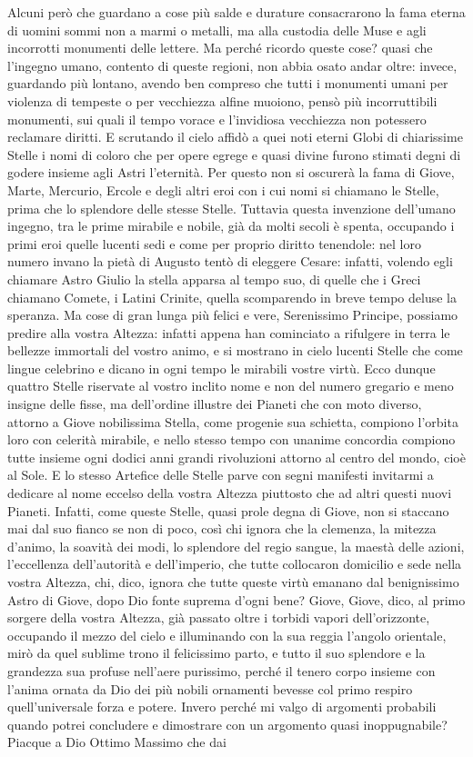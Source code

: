 \documentclass[11pt,twoside,openany]{book}
\begin{document}
Alcuni però che guardano a cose più salde e durature consacrarono la fama eterna di uomini sommi non a marmi o metalli, ma alla custodia delle Muse e agli incorrotti monumenti delle lettere. Ma perché ricordo queste cose? quasi che l'ingegno umano, contento di queste regioni, non abbia osato andar oltre: invece, guardando più lontano, avendo ben compreso che tutti i monumenti umani per violenza di tempeste o per vecchiezza alfine muoiono, pensò più incorruttibili monumenti, sui quali il tempo vorace e l'invidiosa vecchiezza non potessero reclamare diritti. E scrutando il cielo affidò a quei noti eterni Globi di chiarissime Stelle i nomi di coloro che per opere egrege e quasi divine furono stimati degni di godere insieme agli Astri l'eternità. Per questo non si oscurerà la fama di Giove, Marte, Mercurio, Ercole e degli altri eroi con i cui nomi si chiamano le Stelle, prima che lo splendore delle stesse Stelle. Tuttavia questa invenzione dell'umano ingegno, tra le prime mirabile e nobile, già da molti secoli è spenta, occupando i primi eroi quelle lucenti sedi e come per proprio diritto tenendole: nel loro numero invano la pietà di Augusto tentò di eleggere Cesare: infatti, volendo egli chiamare Astro Giulio la stella apparsa al tempo suo, di quelle che i Greci chiamano Comete, i Latini Crinite, quella scomparendo in breve tempo deluse la speranza. Ma cose di gran lunga più felici e vere, Serenissimo Principe, possiamo predire alla vostra Altezza: infatti appena han cominciato a rifulgere in terra le bellezze immortali del vostro animo, e si mostrano in cielo lucenti Stelle che come lingue celebrino e dicano in ogni tempo le mirabili vostre virtù. Ecco dunque quattro Stelle riservate al vostro inclito nome e non del numero gregario e meno insigne delle fisse, ma dell'ordine illustre dei Pianeti che con moto diverso, attorno a Giove nobilissima Stella, come progenie sua schietta, compiono l'orbita loro con celerità mirabile, e nello stesso tempo con unanime concordia compiono tutte insieme ogni dodici anni grandi rivoluzioni attorno al centro del mondo, cioè al Sole. E lo stesso Artefice delle Stelle parve con segni manifesti invitarmi a dedicare al nome eccelso della vostra Altezza piuttosto che ad altri questi nuovi Pianeti. Infatti, come queste Stelle, quasi prole degna di Giove, non si staccano mai dal suo fianco se non di poco, così chi ignora che la clemenza, la mitezza d'animo, la soavità dei modi, lo splendore del regio sangue, la maestà delle azioni, l'eccellenza dell'autorità e dell'imperio, che tutte collocaron domicilio e sede nella vostra Altezza, chi, dico, ignora che tutte queste virtù emanano dal benignissimo Astro di Giove, dopo Dio fonte suprema d'ogni bene? Giove, Giove, dico, al primo sorgere della vostra Altezza, già passato oltre i torbidi vapori dell'orizzonte, occupando il mezzo del cielo e illuminando con la sua reggia l'angolo orientale, mirò da quel sublime trono il felicissimo parto, e tutto il suo splendore e la grandezza sua profuse nell'aere purissimo, perché il tenero corpo insieme con l'anima ornata da Dio dei più nobili ornamenti bevesse col primo respiro quell'universale forza e potere. Invero perché mi valgo di argomenti probabili quando potrei concludere e dimostrare con un argomento quasi inoppugnabile? Piacque a Dio Ottimo Massimo che dai 
\end{document}
